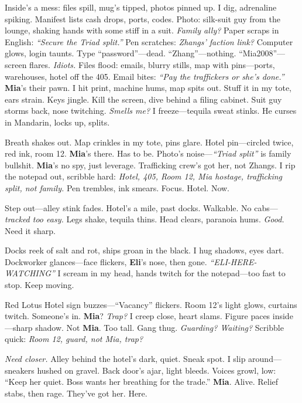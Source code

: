 \documentclass{article}
\begin{document}
Inside’s a mess: files spill, mug’s tipped, photos pinned up. I dig, adrenaline spiking. Manifest lists cash drops, ports, codes. Photo: silk-suit guy from the lounge, shaking hands with some stiff in a suit. \textit{Family ally?} Paper scraps in English: \textit{“Secure the Triad split.”} Pen scratches: \textit{Zhangs’ faction link?} Computer glows, login taunts. Type “password”—dead. “Zhang”—nothing. “Mia2008”—screen flares. \textit{Idiots.} Files flood: emails, blurry stills, map with pins—ports, warehouses, hotel off the 405. Email bites: \textit{“Pay the traffickers or she’s done.”} \textbf{Mia}’s their pawn. I hit print, machine hums, map spits out. Stuff it in my tote, ears strain. Keys jingle. Kill the screen, dive behind a filing cabinet. Suit guy storms back, nose twitching. \textit{Smells me?} I freeze—tequila sweat stinks. He curses in Mandarin, locks up, splits.

Breath shakes out. Map crinkles in my tote, pins glare. Hotel pin—circled twice, red ink, room 12. \textbf{Mia}’s there. Has to be. Photo’s noise—\textit{“Triad split”} is family bullshit. \textbf{Mia}’s no spy, just leverage. Trafficking crew’s got her, not Zhangs. I rip the notepad out, scribble hard: \textit{Hotel, 405, Room 12, Mia hostage, trafficking split, not family.} Pen trembles, ink smears. Focus. Hotel. Now.

Step out—alley stink fades. Hotel’s a mile, past docks. Walkable. No cabs—\textit{tracked too easy.} Legs shake, tequila thins. Head clears, paranoia hums. \textit{Good.} Need it sharp.

Docks reek of salt and rot, ships groan in the black. I hug shadows, eyes dart. Dockworker glances—face flickers, \textbf{Eli}’s nose, then gone. \textit{“ELI-HERE-WATCHING”} I scream in my head, hands twitch for the notepad—too fast to stop. Keep moving.

Red Lotus Hotel sign buzzes—“Vacancy” flickers. Room 12’s light glows, curtains twitch. Someone’s in. \textbf{Mia}? \textit{Trap?} I creep close, heart slams. Figure paces inside—sharp shadow. Not \textbf{Mia}. Too tall. Gang thug. \textit{Guarding? Waiting?} Scribble quick: \textit{Room 12, guard, not Mia, trap?}

\textit{Need closer.} Alley behind the hotel’s dark, quiet. Sneak spot. I slip around—sneakers hushed on gravel. Back door’s ajar, light bleeds. Voices growl, low: “Keep her quiet. Boss wants her breathing for the trade.” \textbf{Mia}. Alive. Relief stabs, then rage. They’ve got her. Here.
\end{document}

